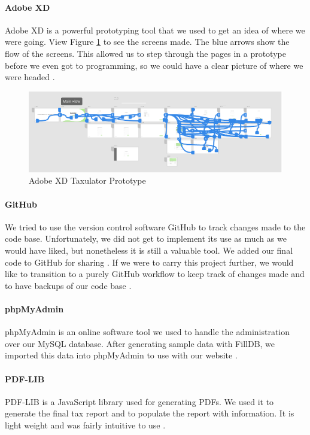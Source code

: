 \documentclass[sigconf]{acmart}
\begin{document}
\paragraph{Adobe XD}
Adobe XD is a powerful prototyping tool that we used to get an idea of where we were going. View Figure \ref{Prototype} to see the screens made. The blue arrows show the flow of the screens. This allowed us to step through the pages in a prototype before we even got to programming, so we could have a clear picture of where we were headed \cite{AdobeXD}.

\begin{figure}[H]
  \includegraphics[width=\linewidth]{Images/Prototype.png}
  \caption{Adobe XD Taxulator Prototype}
  \centering
  \label{Prototype}
\end{figure}

\paragraph{GitHub}
We tried to use the version control software GitHub to track changes made to the code base. Unfortunately, we did not get to implement its use as much as we would have liked, but nonetheless it is still a valuable tool. We added our final code to GitHub for sharing \cite{TaxulatorCode}. If we were to carry this project further, we would like to transition to a purely GitHub workflow to keep track of changes made and to have backups of our code base \cite{GitHub}.

\paragraph{phpMyAdmin}
phpMyAdmin is an online software tool we used to handle the administration over our MySQL database. After generating sample data with FillDB, we imported this data into phpMyAdmin to use with our website \cite{phpMyAdmin}.

\paragraph{PDF-LIB}
PDF-LIB is a JavaScript library used for generating PDFs. We used it to generate the final tax report and to populate the report with information. It is light weight and was fairly intuitive to use \cite{PDF-LIB}.
\end{document}
